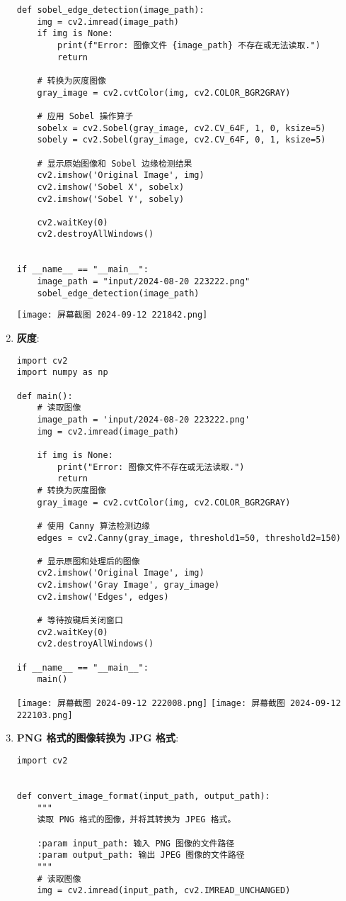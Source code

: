 \documentclass{ctexart}
\begin{document}
\begin{enumerate}[label=\arabic*.]
\begin{lstlisting}
def sobel_edge_detection(image_path):
    img = cv2.imread(image_path)
    if img is None:
        print(f"Error: 图像文件 {image_path} 不存在或无法读取.")
        return

    # 转换为灰度图像
    gray_image = cv2.cvtColor(img, cv2.COLOR_BGR2GRAY)

    # 应用 Sobel 操作算子
    sobelx = cv2.Sobel(gray_image, cv2.CV_64F, 1, 0, ksize=5)
    sobely = cv2.Sobel(gray_image, cv2.CV_64F, 0, 1, ksize=5)

    # 显示原始图像和 Sobel 边缘检测结果
    cv2.imshow('Original Image', img)
    cv2.imshow('Sobel X', sobelx)
    cv2.imshow('Sobel Y', sobely)

    cv2.waitKey(0)
    cv2.destroyAllWindows()


if __name__ == "__main__":
    image_path = "input/2024-08-20 223222.png"
    sobel_edge_detection(image_path)
\end{lstlisting}
\texttt{[image: 屏幕截图 2024-09-12 221842.png]}
\item \textbf{灰度}:
\begin{lstlisting}
import cv2
import numpy as np

def main():
    # 读取图像
    image_path = 'input/2024-08-20 223222.png'
    img = cv2.imread(image_path)

    if img is None:
        print("Error: 图像文件不存在或无法读取.")
        return
    # 转换为灰度图像
    gray_image = cv2.cvtColor(img, cv2.COLOR_BGR2GRAY)

    # 使用 Canny 算法检测边缘
    edges = cv2.Canny(gray_image, threshold1=50, threshold2=150)

    # 显示原图和处理后的图像
    cv2.imshow('Original Image', img)
    cv2.imshow('Gray Image', gray_image)
    cv2.imshow('Edges', edges)

    # 等待按键后关闭窗口
    cv2.waitKey(0)
    cv2.destroyAllWindows()

if __name__ == "__main__":
    main()
\end{lstlisting}
\texttt{[image: 屏幕截图 2024-09-12 222008.png]}
\texttt{[image: 屏幕截图 2024-09-12 222103.png]}
\item \textbf{PNG 格式的图像转换为 JPG 格式}:
\begin{lstlisting}
import cv2


def convert_image_format(input_path, output_path):
    """
    读取 PNG 格式的图像，并将其转换为 JPEG 格式。

    :param input_path: 输入 PNG 图像的文件路径
    :param output_path: 输出 JPEG 图像的文件路径
    """
    # 读取图像
    img = cv2.imread(input_path, cv2.IMREAD_UNCHANGED)


\end{lstlisting}
\end{enumerate}
\end{document}
